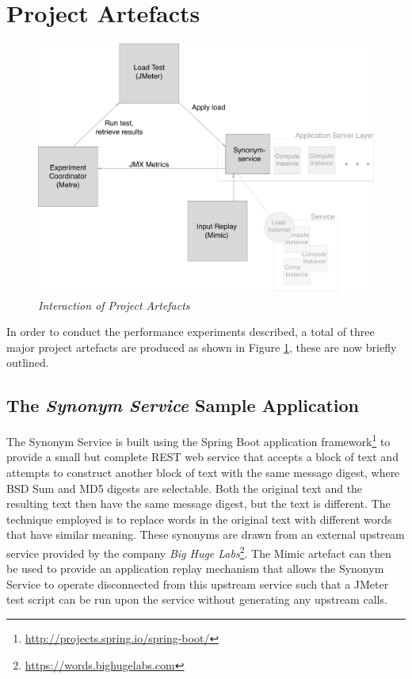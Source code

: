 \documentclass[]{final_report}
\begin{document}
\section*{Project Artefacts}

\begin{figure}
\begin{center}
\includegraphics[scale=0.3]{figures/Scheme_fig.pdf}
\caption{\small \sl Interaction of Project Artefacts \label{fig:scheme}}
\end{center}
\end{figure}

In order to conduct the performance experiments described, a total of three major project artefacts are produced as shown in Figure \ref{fig:scheme}, these are now briefly outlined.

\subsection*{The \textit{Synonym Service} Sample Application}
The Synonym Service is built using the Spring Boot application framework\footnote{\url{http://projects.spring.io/spring-boot/}} to provide a small but complete REST web service that accepts a block of text and attempts to construct another block of text with the same message digest, where BSD Sum and MD5 digests are selectable. Both the original text and the resulting text then have the same message digest, but the text is different\cite{daum:2005}. The technique employed is to replace words in the original text with different words that have similar meaning. These synonyms are drawn from an external upstream service provided by the company \textit{Big Huge Labs}\footnote{\url{https://words.bighugelabs.com}}. The Mimic artefact can then be used to provide an application replay mechanism that allows the Synonym Service to operate disconnected from this upstream service such that a JMeter test script can be run upon the service without generating any upstream calls.
\end{document}
